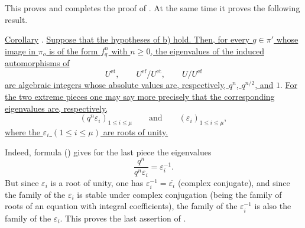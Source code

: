 This proves  and completes the proof of .  At the same time it
proves the following result.

\medskip
\noindent
\underline{Corollary} . \underline{Suppose that the hypotheses of
 b) hold.  Then, for every $g\in\pi'$ whose image in $\pi_o$ is of the
form $f_q^n$ with $n\geq0$, the eigenvalues of the induced automorphisms
of}
\[
 U^{\mathrm{et}},\qquad
 U^{\mathrm{ef}}/U^{\mathrm{et}},\qquad
 U/U^{\mathrm{ef}}
\]
\underline{are algebraic integers whose absolute values are,
respectively, $q^n$, $q^{n/2}$, and} $1$.  \underline{For the two extreme pieces one
may say more precisely that the corresponding eigenvalues are,
respectively,}
\[
 (q^n\varepsilon_i)_{1\leq i\leq\mu}
 \qquad\text{and}\qquad
 (\varepsilon_i)_{1\leq i\leq\mu},
\]
\underline{where the $\varepsilon_i$ $(1\leq i\leq\mu)$ are roots of
unity.}

Indeed, formula () gives for the last piece the eigenvalues
\[
 \frac{q^n}{q^n\varepsilon_i}=\varepsilon_i^{-1}.
\]
But since $\varepsilon_i$ is a root of unity, one has
$\varepsilon_i^{-1}=\overline{\varepsilon_i}$ (complex conjugate), and
since the family of the $\varepsilon_i$ is stable under complex
conjugation (being the family of roots of an equation with integral
coefficients), the family of the $\varepsilon_i^{-1}$ is also the family
of the $\varepsilon_i$.  This proves the last assertion of .
